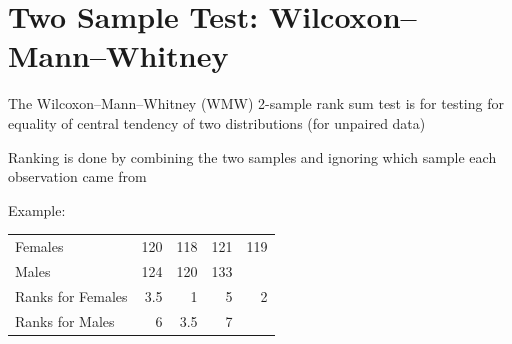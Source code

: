\section{Two Sample Test: Wilcoxon--Mann--Whitney} 
\bi
\item The Wilcoxon--Mann--Whitney (WMW) 2-sample rank sum test is for
  testing for equality of central tendency of two distributions (for
  unpaired data)
\item Ranking is done by combining the two samples and ignoring which
  sample each observation came from
\item Example:

\begin{center}\begin{tabular}{lrrrr} \hline
Females           & 120 & 118 & 121 & 119 \\
Males             & 124 & 120 & 133 &     \\ \hline
Ranks for Females & 3.5 & ~~1 & ~~5 & ~~2 \\
Ranks for Males   & ~~6 & 3.5 & ~~7 &     \\ \hline
\end{tabular}\end{center}

